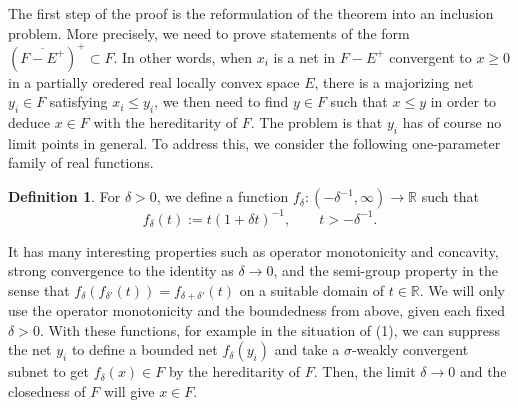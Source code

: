 \documentclass[noamsfonts,a4paper,10pt]{amsart}
\theoremstyle{plain}
\theoremstyle{definition}
\newtheorem{definition}[theorem]{Definition}
\begin{document}
The first step of the proof is the reformulation of the theorem into an inclusion problem.
More precisely, we need to prove statements of the form $(\overline{F-E^+})^+\subset F$.
In other words, when $x_i$ is a net in $F-E^+$ convergent to $x\ge0$ in a partially oredered real locally convex space $E$, there is a majorizing net $y_i\in F$ satisfying $x_i\le y_i$, we then need to find $y\in F$ such that $x\le y$ in order to deduce $x\in F$ with the hereditarity of $F$.
The problem is that $y_i$ has of course no limit points in general.
To address this, we consider the following one-parameter family of real functions.
\begin{definition}
For $\delta>0$, we define a function $f_\delta:(-\delta^{-1},\infty)\to\mathbb{R}$ such that
\[f_\delta(t):=t(1+\delta t)^{-1},\qquad t>-\delta^{-1}.\]
\end{definition}
It has many interesting properties such as operator monotonicity and concavity, strong convergence to the identity as $\delta\to0$, and the semi-group property in the sense that $f_\delta(f_{\delta'}(t))=f_{\delta+\delta'}(t)$ on a suitable domain of $t\in\mathbb{R}$.
We will only use the operator monotonicity and the boundedness from above, given each fixed $\delta>0$.
With these functions, for example in the situation of (1), we can suppress the net $y_i$ to define a bounded net $f_\delta(y_i)$ and take a $\sigma$-weakly convergent subnet to get $f_\delta(x)\in F$ by the hereditarity of $F$.
Then, the limit $\delta\to0$ and the closedness of $F$ will give $x\in F$.
\end{document}
